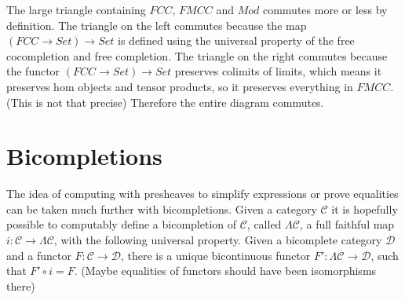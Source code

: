 \documentclass[12pt]{article} %
\theoremstyle{definition}
\theoremstyle{definition}
\theoremstyle{definition}
\theoremstyle{definition}
\begin{document}

The large triangle containing $FCC$, $FMCC$ and $Mod$ commutes more or less by definition. The triangle on the left commutes because
the map $(FCC \rightarrow Set) \rightarrow Set$ is defined using the universal property of the free cocompletion and free completion.
The triangle on the right commutes because the functor $(FCC \rightarrow Set) \rightarrow Set$ preserves colimits of limits,
which means it preserves hom objects and tensor products, so it preserves everything in $FMCC$. (This is not that precise)
Therefore the entire diagram commutes.

\section{Bicompletions}

The idea of computing with presheaves to simplify expressions or prove equalities can be taken much further with bicompletions.
Given a category $\mathcal{C}$ it is hopefully possible to computably define a bicompletion of $\mathcal{C}$, called $\Lambda \mathcal{C}$, a 
full faithful map $i : \mathcal{C} \rightarrow \Lambda \mathcal{C}$, with the following universal property.
Given a bicomplete category $\mathcal{D}$ and a functor $F : \mathcal{C} \rightarrow \mathcal{D}$, there is a unique 
bicontinuous functor $F' : \Lambda \mathcal{C} \rightarrow \mathcal{D}$,
such that $F' \circ i = F$. (Maybe equalities of functors should have been isomorphisms there)
\end{document}
